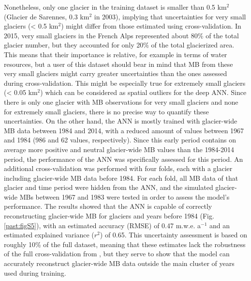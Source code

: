{Nonetheless, only one glacier in the training dataset is smaller than 0.5 km$^{2}$ (Glacier de Sarennes, 0.3 km$^{2}$ in 2003), implying that uncertainties for very small glaciers (< 0.5 km$^{2}$) might differ from those estimated using cross-validation. In 2015, very small glaciers in the French Alps represented about 80\% of the total glacier number, but they accounted for only 20\% of the total glacierized area. This means that their importance is relative, for example in terms of water resources, but a user of this dataset should bear in mind that MB from these very small glaciers might carry greater uncertainties than the ones assessed during cross-validation. This might be especially true for extremely small glaciers (< 0.05 km$^{2}$) which can be considered as spatial outliers for the deep ANN. Since there is only one glacier with MB observations for very small glaciers and none for extremely small glaciers, there is no precise way to quantify these uncertainties. On the other hand, the ANN is mostly trained with glacier-wide MB data between 1984 and 2014, with a reduced amount of values between 1967 and 1984 (986 and 62 values, respectively). Since this early period contains on average more positive and neutral glacier-wide MB values than the 1984-2014 period, the performance of the ANN was specifically assessed for this period. An additional cross-validation was performed with four folds, each with a glacier including glacier-wide MB data before 1984. For each fold, all MB data of that glacier and time period were hidden from the ANN, and the simulated glacier-wide MBs between 1967 and 1983 were tested in order to assess the model’s performance. The results showed that the ANN is capable of correctly reconstructing glacier-wide MB for glaciers and years before 1984 (Fig. \ref{past:figS5}), with an estimated accuracy (RMSE) of 0.47 m.w.e. a$^{-1}$ and an estimated explained variance ($r^{2}$) of  0.65. This uncertainty assessment is based on roughly 10\% of the full dataset, meaning that these estimates lack the robustness of the full cross-validation from \citet{bolibar_deep_2020-1}, but they serve to show that the model can accurately reconstruct glacier-wide MB data outside the main cluster of years used during training. 

}

